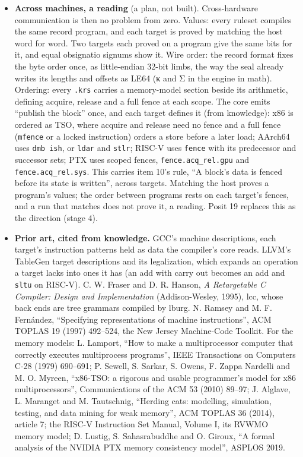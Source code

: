 \begin{enumerate}
\begin{itemize}
\begin{enumerate}
\begin{itemize}
\item \textbf{Across machines, a reading} (a plan, not built). Cross-hardware communication is then no problem from zero. Values: every ruleset compiles the same record program, and each target is proved by matching the host word for word. Two targets each proved on a program give the same bits for it, and equal obsignatio signums show it. Wire order: the record format fixes the byte order once, as little-endian 32-bit limbs, the way the seal already writes its lengths and offsets as LE64 (κ and Σ in the engine in math). Ordering: every \texttt{.\allowbreak{}krs} carries a memory-model section beside its arithmetic, defining acquire, release and a full fence at each scope. The core emits “publish the block” once, and each target defines it (from knowledge): x86 is ordered as TSO, where acquire and release need no fence and a full fence (\texttt{mfence} or a locked instruction) orders a store before a later load; AArch64 uses \texttt{dmb ish}, or \texttt{ldar} and \texttt{stlr}; RISC-V uses \texttt{fence} with its predecessor and successor sets; PTX uses scoped fences, \texttt{fence.\allowbreak{}acq\_\allowbreak{}rel.\allowbreak{}gpu} and \texttt{fence.\allowbreak{}acq\_\allowbreak{}rel.\allowbreak{}sys}. This carries item 10's rule, “A block's data is fenced before its state is written”, across targets. Matching the host proves a program's values; the order between programs rests on each target's fences, and a run that matches does not prove it, a reading. Posit 19 replaces this as the direction (stage 4).
\item \textbf{Prior art, cited from knowledge.} GCC's machine descriptions, each target's instruction patterns held as data the compiler's core reads. LLVM's TableGen target descriptions and its legalization, which expands an operation a target lacks into ones it has (an add with carry out becomes an add and \texttt{sltu} on RISC-V). C. W. Fraser and D. R. Hanson, \emph{A Retargetable C Compiler: Design and Implementation} (Addison-Wesley, 1995), lcc, whose back ends are tree grammars compiled by lburg. N. Ramsey and M. F. Fernández, “Specifying representations of machine instructions”, ACM TOPLAS 19 (1997) 492–524, the New Jersey Machine-Code Toolkit. For the memory models: L. Lamport, “How to make a multiprocessor computer that correctly executes multiprocess programs”, IEEE Transactions on Computers C-28 (1979) 690–691; P. Sewell, S. Sarkar, S. Owens, F. Zappa Nardelli and M. O. Myreen, “x86-TSO: a rigorous and usable programmer's model for x86 multiprocessors”, Communications of the ACM 53 (2010) 89–97; J. Alglave, L. Maranget and M. Tautschnig, “Herding cats: modelling, simulation, testing, and data mining for weak memory”, ACM TOPLAS 36 (2014), article 7; the RISC-V Instruction Set Manual, Volume I, its RVWMO memory model; D. Lustig, S. Sahasrabuddhe and O. Giroux, “A formal analysis of the NVIDIA PTX memory consistency model”, ASPLOS 2019.

\end{itemize}
\end{enumerate}
\end{itemize}
\end{enumerate}
